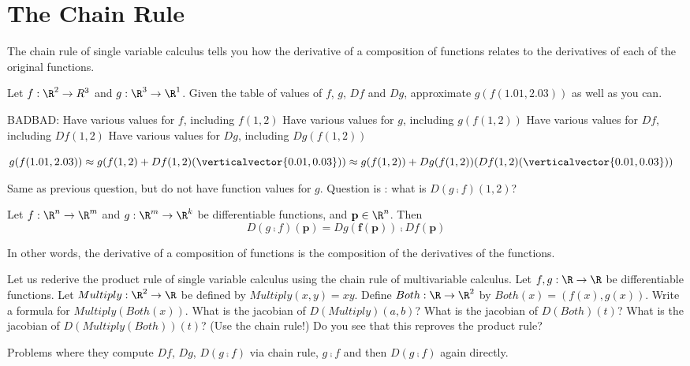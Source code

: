 
\section{The Chain Rule}

The chain rule of single variable calculus tells you how the derivative of a composition of functions relates to the derivatives of each of the original functions.

\begin{question}
	Let $f:\R^2 \to R^3$ and $g:\R^3 \to \R^1$.  Given the table of values of $f$, $g$, $Df$ and $Dg$, approximate $g(f(1.01,2.03))$ as well as you can.
	
	BADBAD: 
	Have various values for $f$, including $f(1,2)$
	Have various values for $g$, including $g(f(1,2))$
	Have various values for $Df$, including $Df(1,2)$
	Have various values for $Dg$, including $Dg(f(1,2))$
	\begin{answer}
		$g(f(1.01,2.03)) \approx g(f(1,2)+ Df(1,2)(\verticalvector{0.01,0.03}))
								 \approx g(f(1,2))+ Dg(f(1,2))(Df(1,2)(\verticalvector{0.01,0.03}))$
	\end{answer}
\end{question}

\begin{question}
	Same as previous question, but do not have function values for $g$.  Question is :  what is $D(g \comp f)(1,2)$?
\end{question}

\begin{theorem}
	Let $f:\R^n \to \R^m$ and $g: \R^m \to \R^k$ be differentiable functions, and $\mathbf{p} \in \R^n$.  Then 
	\[
		D(g \comp f)(\mathbf{p}) = Dg(\mathbf{f(p)}) \comp Df(\mathbf{p})
	\]
	
	In other words, the derivative of a composition of functions is the composition of the derivatives of the functions.
\end{theorem}

\begin{question}
	Let us rederive the product rule of single variable calculus using the chain rule of multivariable calculus.
	Let $f,g:\R \to \R$ be differentiable functions.  Let $Multiply:\R^2 \to \R$ be defined by $Multiply(x,y) = xy$.  
	Define $Both:\R \to \R^2$  by $Both(x) = (f(x),g(x))$. 
	Write a formula for $Multiply(Both(x))$.
	What is the jacobian of $D(Multiply)(a,b)$?
	What is the jacobian of $D(Both)(t)$?
	What is the jacobian of $D(Multiply(Both))(t)$? (Use the chain rule!)
	Do you see that this reproves the product rule?
\end{question}

\begin{question}
	Problems where they compute $Df$, $Dg$,  $D(g \comp f)$ via chain rule, $g \comp f$ and then $D(g \comp f)$ again directly.
\end{question}




